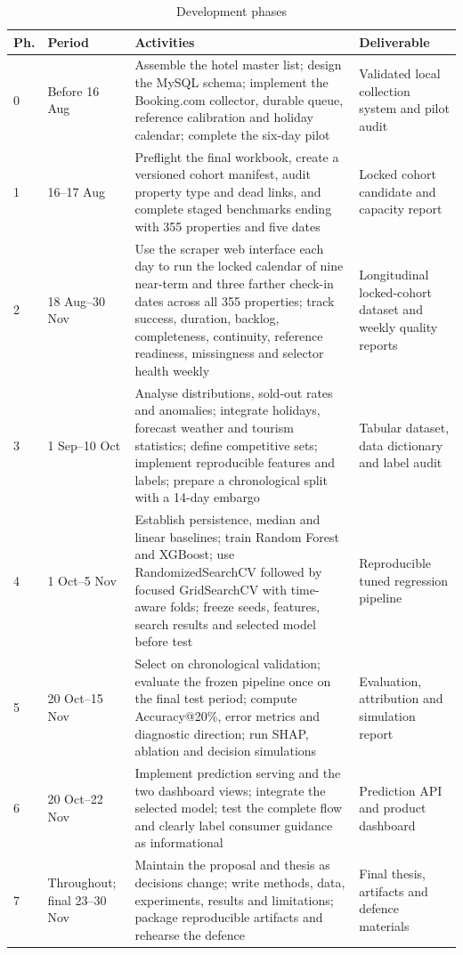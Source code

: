 \begin{table}[!htbp]
\centering
\caption{Development phases}
\label{tab:phases}
\begin{tabular}{|p{0.7cm}|p{2.2cm}|p{6.7cm}|p{3.1cm}|}
\hline
\textbf{Ph.} & \textbf{Period} & \textbf{Activities} & \textbf{Deliverable} \\
\hline
0 & Before 16 Aug & Assemble the hotel master list; design the MySQL schema; implement the Booking.com collector, durable queue, reference calibration and holiday calendar; complete the six-day pilot & Validated local collection system and pilot audit \\
\hline
1 & 16--17 Aug & Preflight the final workbook, create a versioned cohort manifest, audit property type and dead links, and complete staged benchmarks ending with 355 properties and five dates & Locked cohort candidate and capacity report \\
\hline
2 & 18 Aug--30 Nov & Use the scraper web interface each day to run the locked calendar of nine near-term and three farther check-in dates across all 355 properties; track success, duration, backlog, completeness, continuity, reference readiness, missingness and selector health weekly & Longitudinal locked-cohort dataset and weekly quality reports \\
\hline
3 & 1 Sep--10 Oct & Analyse distributions, sold-out rates and anomalies; integrate holidays, forecast weather and tourism statistics; define competitive sets; implement reproducible features and labels; prepare a chronological split with a 14-day embargo & Tabular dataset, data dictionary and label audit \\
\hline
4 & 1 Oct--5 Nov & Establish persistence, median and linear baselines; train Random Forest and XGBoost; use RandomizedSearchCV followed by focused GridSearchCV with time-aware folds; freeze seeds, features, search results and selected model before test & Reproducible tuned regression pipeline \\
\hline
5 & 20 Oct--15 Nov & Select on chronological validation; evaluate the frozen pipeline once on the final test period; compute Accuracy@20\%, error metrics and diagnostic direction; run SHAP, ablation and decision simulations & Evaluation, attribution and simulation report \\
\hline
6 & 20 Oct--22 Nov & Implement prediction serving and the two dashboard views; integrate the selected model; test the complete flow and clearly label consumer guidance as informational & Prediction API and product dashboard \\
\hline
7 & Throughout; final 23--30 Nov & Maintain the proposal and thesis as decisions change; write methods, data, experiments, results and limitations; package reproducible artifacts and rehearse the defence & Final thesis, artifacts and defence materials \\
\hline
\end{tabular}
\end{table}

